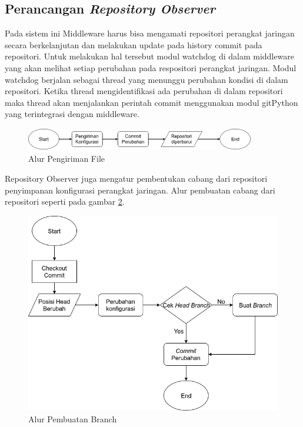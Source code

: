         \subsection{Perancangan \textit{Repository Observer}}
            Pada sistem ini Middleware harus bisa mengamati repositori perangkat jaringan secara berkelanjutan dan melakukan update pada history commit pada repositori. Untuk melakukan hal tersebut modul watchdog di dalam middleware yang akan melihat setiap perubahan pada respositori perangkat jaringan. Modul watchdog berjalan sebagai thread yang menunggu perubahan kondisi di dalam repositori. Ketika thread mengidentifikasi ada perubahan di dalam repositori maka thread akan menjalankan perintah commit menggunakan modul gitPython yang terintegrasi dengan middleware.
            \begin{figure}[H]
            	\centering
            	\includegraphics[width=10cm,height=1cm]{Images/C-3/AlurPengirimanFile.png}
            	\caption{Alur Pengiriman File}
            	\label{desain:pengiriman file}
            \end{figure}
	        \indent Repository Observer juga mengatur pembentukan cabang dari repositori penyimpanan konfigurasi perangkat jaringan. Alur pembuatan cabang dari repositori seperti pada gambar \ref{CreateBranch}.
	        \begin{figure}[H]
	        	\centering
	        	\includegraphics[width=\textwidth]{Images/C-3/CreateBranch.png}
	        	\caption{Alur Pembuatan Branch}
	        	\label{CreateBranch}
	        \end{figure}
        
